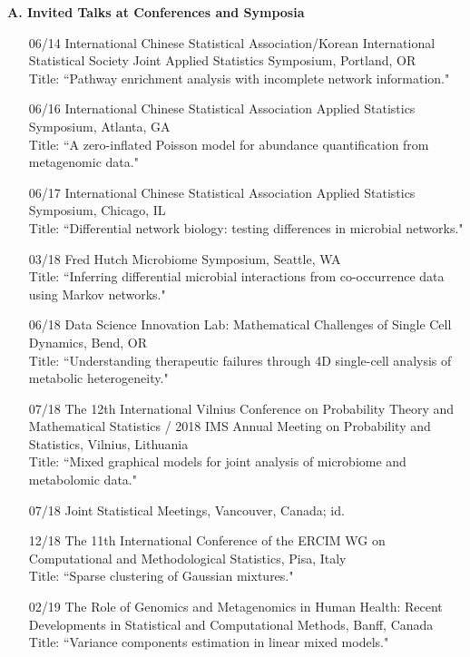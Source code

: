 \documentclass[10pt]{article}
\begin{document}
\textbf{A. Invited Talks at Conferences and Symposia}
\begin{enumerate}  
\item[06/14] International Chinese Statistical Association/Korean International Statistical Society Joint Applied Statistics Symposium, Portland, OR \\
Title: {``Pathway enrichment analysis with incomplete network information."} 
\item[06/16] International Chinese Statistical Association Applied Statistics Symposium, Atlanta, GA \\
Title: {``A zero-inflated Poisson model for abundance quantification from metagenomic data."}   
\item[06/17] International Chinese Statistical Association Applied Statistics Symposium, Chicago, IL\\
Title: {``Differential network biology: testing differences in microbial networks."} 
\item[03/18] Fred Hutch Microbiome Symposium, Seattle, WA \\
Title: {``Inferring differential microbial interactions from co-occurrence data using Markov networks."} 
\item[06/18] Data Science Innovation Lab: Mathematical Challenges of Single Cell Dynamics, Bend, OR\\
Title: {``Understanding therapeutic failures through 4D single-cell analysis of metabolic heterogeneity."} 
\item[07/18] The 12th International Vilnius Conference on Probability Theory and Mathematical Statistics / 2018 IMS Annual Meeting on Probability and Statistics, Vilnius, Lithuania  \\
Title:  {``Mixed graphical models for joint analysis of microbiome and metabolomic data."}
\item[07/18] Joint Statistical Meetings, Vancouver, Canada; id.
\item[12/18] The 11th International Conference of the ERCIM WG on Computational and Methodological Statistics, Pisa, Italy  \\
Title: {``Sparse clustering of Gaussian mixtures."} 
\item[02/19] The Role of Genomics and Metagenomics in Human Health: Recent Developments in Statistical and Computational Methods, Banff, Canada\\
Title: {``Variance components estimation in linear mixed models."} 

\end{enumerate}
\end{document}

